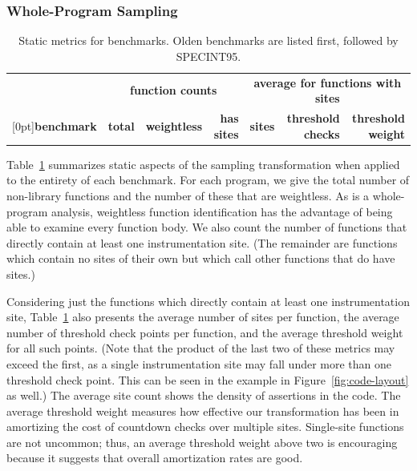 \subsubsection{Whole-Program Sampling}
\label{sec:share:whole}

\begin{table}[tb]
  \centering
  \small
  \begin{tabular}{|l|rrr|rrr|}
    \hline
    & \multicolumn{3}{c|}{\textbf{function counts}} & \multicolumn{3}{c|}{\textbf{average for functions with sites}} \\
    \raisebox{1.5ex}[0pt]{\textbf{benchmark}} & \textbf{total} & \textbf{weightless} & \textbf{has sites} & \textbf{sites} & \textbf{threshold checks} & \textbf{threshold weight} \\
    \hline\hline
    
  \end{tabular}
  \caption{Static metrics for \CCured benchmarks.  Olden benchmarks
    are listed first, followed by SPECINT95.}
  \label{tab:share:static}
\end{table}

Table~\ref{tab:share:static} summarizes static aspects of the sampling
transformation when applied to the entirety of each benchmark.  For
each program, we give the total number of non-library functions and
the number of these that are weightless.  As \CCured is a
whole-program analysis, weightless function identification has the
advantage of being able to examine every function body.  We also count
the number of functions that directly contain at least one
instrumentation site.  (The remainder are functions which contain no
sites of their own but which call other functions that do have sites.)

Considering just the functions which directly contain at least one
instrumentation site, Table~\ref{tab:share:static} also presents the
average number of sites per function, the average number of threshold
check points per function, and the average threshold weight for all
such points.  (Note that the product of the last two of these metrics
may exceed the first, as a single instrumentation site may fall under
more than one threshold check point.  This can be seen in the example
in Figure~\ref{fig:code-layout} as well.)  The average site count
shows the density of assertions in the code.  The average
threshold weight measures how effective our transformation has been in
amortizing the cost of countdown checks over multiple sites.
Single-site functions are not uncommon; thus, an average threshold
weight above two is encouraging because it suggests that overall
amortization rates are good.

